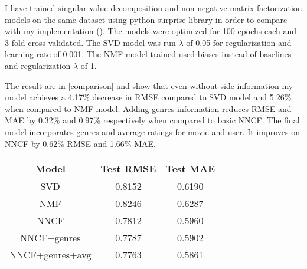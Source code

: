 I have trained singular value decomposition and non-negative matrix factorization models on the same dataset using python surprise library in order to compare with my implementation (\citet{Surprise}). The models were optimized for 100 epochs each and 3 fold cross-validated. 
The SVD model was run $\lambda$ of 0.05 for regularization and learning rate of 0.001. The NMF model trained used biases instead of baselines and regularization $\lambda$ of 1.

The result are in \ref{comparison} and show that even without side-information my model achieves a 4.17\% decrease in RMSE compared to SVD model and 5.26\% when compared to NMF model. Adding genres information reduces RMSE and MAE by 0.32\% and 0.97\% respectively when compared to basic NNCF. The final model incorporates genres and average ratings for movie and user. It improves on NNCF by 0.62\% RMSE and 1.66\% MAE.

\begin{center}
    \begin{tabular}{||c c c||}
    \hline
    Model & Test RMSE & Test MAE \\ [0.5ex]
    \hline
    SVD & 0.8152 & 0.6190 \\
    \hline
    NMF & 0.8246 & 0.6287 \\
    \hline
    NNCF & 0.7812 & 0.5960 \\
    \hline 
    NNCF+genres & 0.7787 & 0.5902 \\
    \hline
    NNCF+genres+avg & 0.7763 & 0.5861 \\[1ex]
    \hline
   \end{tabular}
\label{comparison}
\end{center}